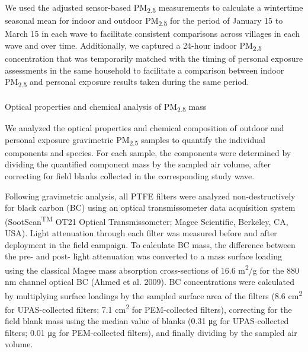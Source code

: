 \documentclass[
  letterpaper,
  DIV=11,
  numbers=noendperiod]{scrartcl}
\makeatletter
\let\oldparagraph\paragraph
\renewcommand{\paragraph}{
    \@ifstar
      \xxxParagraphStar
      \xxxParagraphNoStar
  }
\newcommand{\xxxParagraphStar}[1]{\oldparagraph*{#1}\mbox{}}
\newcommand{\xxxParagraphNoStar}[1]{\oldparagraph{#1}\mbox{}}
\makeatother
\begin{document}
We used the adjusted sensor-based
PM\textsubscript{2.5} measurements to calculate a wintertime seasonal
mean for indoor and outdoor PM\textsubscript{2.5} for the period of
January 15 to March 15 in each wave to facilitate consistent comparisons
across villages in each wave and over time. Additionally, we captured a
24-hour indoor PM\textsubscript{2.5} concentration that was temporarily
matched with the timing of personal exposure assessments in the same
household to facilitate a comparison between indoor
PM\textsubscript{2.5} and personal exposure results taken during the
same period.

\paragraph{\texorpdfstring{Optical properties and chemical analysis of
PM\textsubscript{2.5}
mass}{Optical properties and chemical analysis of PM2.5 mass}}\label{optical-properties-and-chemical-analysis-of-pm2.5-mass}

We analyzed the optical properties and chemical composition of outdoor
and personal exposure gravimetric PM\textsubscript{2.5} samples to
quantify the individual components and species. For each sample, the
components were determined by dividing the quantified component mass by
the sampled air volume, after correcting for field blanks collected in
the corresponding study wave.

Following gravimetric analysis, all PTFE filters were analyzed
non-destructively for black carbon (BC) using an optical transmissometer
data acquisition system (SootScan\textsuperscript{TM} OT21 Optical
Transmissometer; Magee Scientific, Berkeley, CA, USA). Light attenuation
through each filter was measured before and after deployment in the
field campaign. To calculate BC mass, the difference between the pre-
and post- light attenuation was converted to a mass surface loading
using the classical Magee mass absorption cross-sections of 16.6
m\textsuperscript{2}/g for the 880 nm channel optical BC (Ahmed et al.
2009). BC concentrations were calculated by multiplying surface loadings
by the sampled surface area of the filters (8.6 cm\textsuperscript{2}
for UPAS-collected filters; 7.1 cm\textsuperscript{2} for PEM-collected
filters), correcting for the field blank mass using the median value of
blanks (0.31 μg for UPAS-collected filters; 0.01 μg for PEM-collected
filters), and finally dividing by the sampled air volume.
\end{document}
